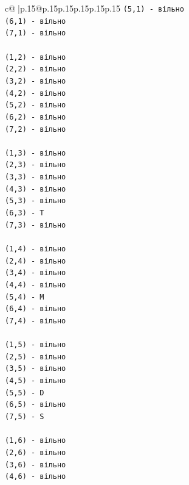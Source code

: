 \documentclass{article}
\begin{document}
{\begin{supertabular}{c@{$\;$}|p{.15\linewidth}@{}p{.15\linewidth}p{.15\linewidth}p{.15\linewidth}p{.15\linewidth}p{.15\linewidth}}
{{{\texttt{(5,1) {-} вільно} \\
\texttt{(6,1) {-} вільно} \\
\texttt{(7,1) {-} вільно} \\
\\ 
\texttt{(1,2) {-} вільно} \\
\texttt{(2,2) {-} вільно} \\
\texttt{(3,2) {-} вільно} \\
\texttt{(4,2) {-} вільно} \\
\texttt{(5,2) {-} вільно} \\
\texttt{(6,2) {-} вільно} \\
\texttt{(7,2) {-} вільно} \\
\\ 
\texttt{(1,3) {-} вільно} \\
\texttt{(2,3) {-} вільно} \\
\texttt{(3,3) {-} вільно} \\
\texttt{(4,3) {-} вільно} \\
\texttt{(5,3) {-} вільно} \\
\texttt{(6,3) {-} T} \\
\texttt{(7,3) {-} вільно} \\
\\ 
\texttt{(1,4) {-} вільно} \\
\texttt{(2,4) {-} вільно} \\
\texttt{(3,4) {-} вільно} \\
\texttt{(4,4) {-} вільно} \\
\texttt{(5,4) {-} M} \\
\texttt{(6,4) {-} вільно} \\
\texttt{(7,4) {-} вільно} \\
\\ 
\texttt{(1,5) {-} вільно} \\
\texttt{(2,5) {-} вільно} \\
\texttt{(3,5) {-} вільно} \\
\texttt{(4,5) {-} вільно} \\
\texttt{(5,5) {-} D} \\
\texttt{(6,5) {-} вільно} \\
\texttt{(7,5) {-} S} \\
\\ 
\texttt{(1,6) {-} вільно} \\
\texttt{(2,6) {-} вільно} \\
\texttt{(3,6) {-} вільно} \\
\texttt{(4,6) {-} вільно} \\
}}}
\end{supertabular}}
\end{document}
